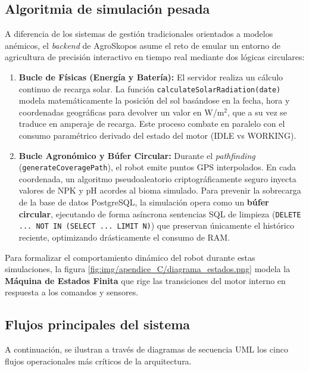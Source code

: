 \subsection{Algoritmia de simulación pesada}
A diferencia de los sistemas de gestión tradicionales orientados a modelos anémicos, el \textit{backend} de AgroSkopos asume el reto de emular un entorno de agricultura de precisión interactivo en tiempo real mediante dos lógicas circulares:

\begin{enumerate}
    \item \textbf{Bucle de Físicas (Energía y Batería):} El servidor realiza un cálculo continuo de recarga solar. La función \texttt{calculateSolarRadiation(date)} modela matemáticamente la posición del sol basándose en la fecha, hora y coordenadas geográficas para devolver un valor en W/m$^2$, que a su vez se traduce en amperaje de recarga. Este proceso combate en paralelo con el consumo paramétrico derivado del estado del motor (IDLE vs WORKING).
    \item \textbf{Bucle Agronómico y Búfer Circular:} Durante el \textit{pathfinding} (\texttt{generateCoveragePath}), el robot emite puntos GPS interpolados. En cada coordenada, un algoritmo pseudoaleatorio criptográficamente seguro inyecta valores de NPK y pH acordes al bioma simulado. Para prevenir la sobrecarga de la base de datos PostgreSQL, la simulación opera como un \textbf{búfer circular}, ejecutando de forma asíncrona sentencias SQL de limpieza (\texttt{DELETE ... NOT IN (SELECT ... LIMIT N)}) que preservan únicamente el histórico reciente, optimizando drásticamente el consumo de RAM.
\end{enumerate}

Para formalizar el comportamiento dinámico del robot durante estas simulaciones, la figura \ref{fig:img/apendice_C/diagrama_estados.png} modela la \textbf{Máquina de Estados Finita} que rige las transiciones del motor interno en respuesta a los comandos y sensores.


\subsection{Flujos principales del sistema}
A continuación, se ilustran a través de diagramas de secuencia UML los cinco flujos operacionales más críticos de la arquitectura.

